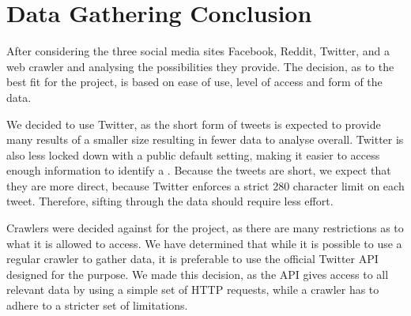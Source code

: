 \section{Data Gathering Conclusion}\label{sec:social-media-conclusion}
After considering the three social media sites Facebook, Reddit, Twitter, and a
web crawler and analysing the possibilities they provide. The decision, as to
the best fit for the project, is based on ease of use, level of access and form
of the data.\nl

We decided to use Twitter, as the short form of tweets is expected to provide
many results of a smaller size resulting in fewer data to analyse overall.
Twitter is also less locked down with a public default setting, making it easier
to access enough information to identify a \fb. Because the tweets are short, we
expect that they are more direct, because Twitter enforces a strict 280
character limit on each tweet. Therefore, sifting through the data should
require less effort.\nl

Crawlers were decided against for the project, as there are many restrictions as
to what it is allowed to access. We have determined that while it is possible to
use a regular crawler to gather data, it is preferable to use the official
Twitter \ac{API} designed for the purpose. We made this decision, as the
\ac{API} gives access to all relevant data by using a simple set of \ac{HTTP}
requests, while a crawler has to adhere to a stricter set of limitations.


